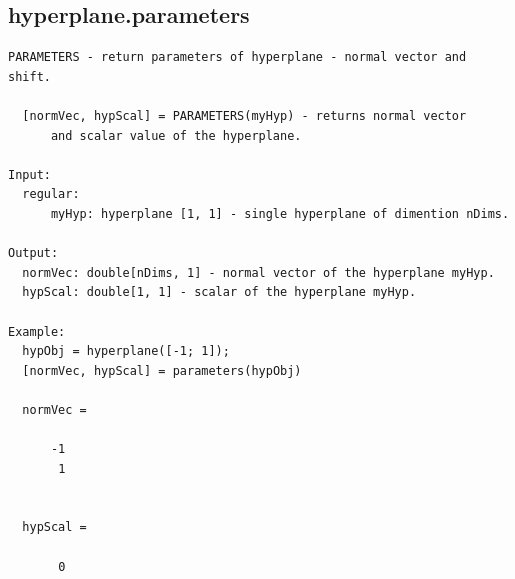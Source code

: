\documentclass[letterpaper,10pt,english]{sphinxmanual}
\begin{document}
\subsection{hyperplane.parameters}
\label{chap_functions:hyperplane-parameters}
\begin{Verbatim}[commandchars=\\\{\}]
PARAMETERS - return parameters of hyperplane - normal vector and shift.

  [normVec, hypScal] = PARAMETERS(myHyp) - returns normal vector
      and scalar value of the hyperplane.

Input:
  regular:
      myHyp: hyperplane [1, 1] - single hyperplane of dimention nDims.

Output:
  normVec: double[nDims, 1] - normal vector of the hyperplane myHyp.
  hypScal: double[1, 1] - scalar of the hyperplane myHyp.

Example:
  hypObj = hyperplane([-1; 1]);
  [normVec, hypScal] = parameters(hypObj)

  normVec =

      -1
       1


  hypScal =

       0
\end{Verbatim}
\end{document}
